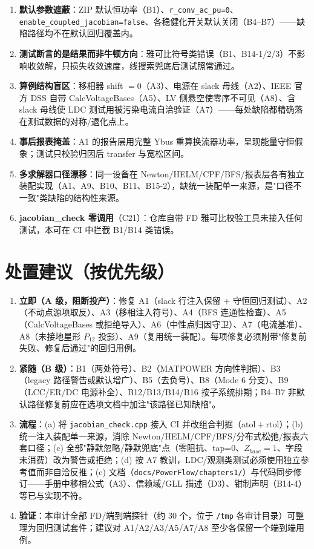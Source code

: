 \documentclass[11pt,a4paper,fontset=fandol]{ctexart}
\newcommand{\file}[1]{\texttt{#1}}
\begin{document}
\begin{enumerate}
  \item \textbf{默认参数遮蔽}：ZIP 默认恒功率（B1）、\texttt{r\_conv\_ac\_pu=0}、\texttt{enable\_coupled\_jacobian=false}、各稳健化开关默认关闭（B4--B7）——缺陷路径均不在默认回归覆盖内。
  \item \textbf{测试断言的是结果而非牛顿方向}：雅可比符号类错误（B1、B14-1/2/3）不影响收敛解，只损失收敛速度，线搜索兜底后测试照常通过。
  \item \textbf{算例结构盲区}：移相器 shift $=0$（A3）、电源在 slack 母线（A2）、IEEE 官方 DSS 自带 CalcVoltageBases（A5）、LV 侧悬空使零序不可见（A8）、含 slack 母线使 LDC 测试用被污染电流自洽验证（A7）——每处缺陷都精确落在测试数据的对称/退化点上。
  \item \textbf{事后报表掩盖}：A1 的报告层用完整 Ybus 重算换流器功率，呈现能量守恒假象；测试只校验归因后 transfer 与宽松区间。
  \item \textbf{多求解器口径漂移}：同一设备在 Newton/HELM/CPF/BFS/报表层各有独立装配实现（A1、A9、B10、B11、B15-2），缺统一装配单一来源，是"口径不一致"类缺陷的结构性来源。
  \item \textbf{jacobian\_check 零调用}（C21）：仓库自带 FD 雅可比校验工具未接入任何测试，本可在 CI 中拦截 B1/B14 类错误。
\end{enumerate}

\section{处置建议（按优先级）}
\label{sec:recommend}

\begin{enumerate}
  \item \textbf{立即（A 级，阻断投产）}：修复 A1（slack 行注入保留 $+$ 守恒回归测试）、A2（不动点源项取反）、A3（移相注入符号）、A4（BFS 连通性检查）、A5（CalcVoltageBases 或拒绝导入）、A6（中性点归因守卫）、A7（电流基准）、A8（未接地星形 $P_{12}$ 投影）、A9（复用统一装配）。每项修复必须附带"修复前失败、修复后通过"的回归用例。
  \item \textbf{紧随（B 级）}：B1（两处符号）、B2（MATPOWER 方向性判据）、B3（legacy 路径警告或默认增广）、B5（去负号）、B8（Mode 6 分支）、B9（LCC/ER/DC 电源补全）、B12/B13/B14/B16 按子系统排期；B4--B7 非默认路径修复前应在选项文档中加注"该路径已知缺陷"。
  \item \textbf{流程}：(a) 将 \file{jacobian\_check.cpp} 接入 CI 并改组合判据（$\mathrm{atol}+\mathrm{rtol}$）；(b) 统一注入装配单一来源，消除 Newton/HELM/CPF/BFS/分布式松弛/报表六套口径；(c) 全部"静默忽略/静默兜底"点（零阻抗、tap=0、$Z_{base}=1$、字段未消费）改为警告或拒绝；(d) 按 A7 教训，LDC/观测类测试必须使用独立参考值而非自洽反推；(e) 文档（\file{docs/PowerFlow/chapters1/}）与代码同步修订——手册中移相公式（A3）、信赖域/GLL 描述（D3）、钳制声明（B14-4）等已与实现不符。
  \item \textbf{验证}：本审计全部 FD/端到端探针（约 30 个，位于 \file{/tmp} 各审计目录）可整理为回归测试套件；建议对 A1/A2/A3/A5/A7/A8 至少各保留一个端到端用例。
\end{enumerate}
\end{document}
